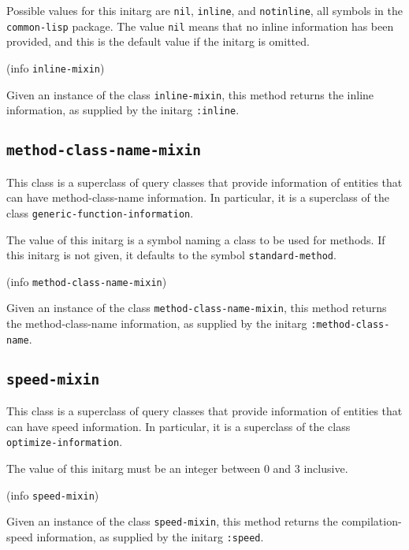 Possible values for this initarg are \texttt{nil}, \texttt{inline},
and \texttt{notinline}, all symbols in the \texttt{common-lisp}
package.  The value \texttt{nil} means that no inline information has
been provided, and this is the default value if the initarg is omitted.

 {(info {\tt inline-mixin})}

Given an instance of the class \texttt{inline-mixin}, this method
returns the inline information, as supplied by the initarg
\texttt{:inline}.

\subsection{\texttt{method-class-name-mixin}}
\label{sec-method-class-name-mixin}

This class is a superclass of query classes that provide information
of entities that can have method-class-name information.  In
particular, it is a superclass of the class
\texttt{generic-function-information}.


The value of this initarg is a symbol naming a class to be used for
methods.  If this initarg is not given, it defaults to the symbol
\texttt{standard-method}.

 {(info {\tt method-class-name-mixin})}

Given an instance of the class \texttt{method-class-name-mixin}, this
method returns the method-class-name information, as supplied by the
initarg \texttt{:method-class-name}.

\subsection{\texttt{speed-mixin}}
\label{sec-speed-mixin}

This class is a superclass of query classes that provide information
of entities that can have speed information.  In particular, it is a
superclass of the class \texttt{optimize-information}.


The value of this initarg must be an integer between $0$ and $3$
inclusive.

 {(info {\tt speed-mixin})}

Given an instance of the class \texttt{speed-mixin}, this method
returns the compilation-speed information, as supplied by the initarg
\texttt{:speed}.

